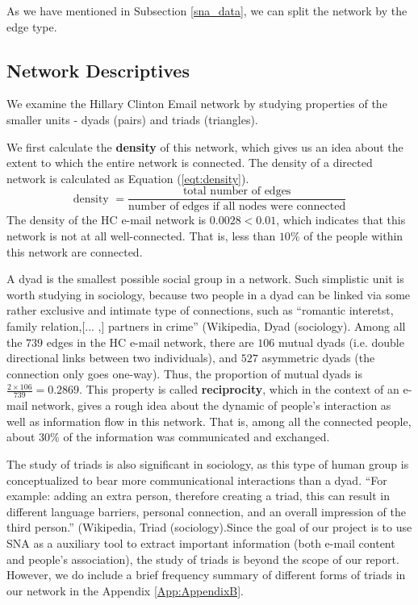 \documentclass[11pt]{article}
\begin{document}
\clearpage
As we have mentioned in Subsection \ref{sna_data}, we can split the network by the edge type.

\subsection{Network Descriptives}
We examine the Hillary Clinton Email network by studying properties of the smaller units - dyads (pairs) and triads (triangles).   

We first calculate the {\bf density} of this network, which gives us an idea about the extent to which the entire network is connected. The density of a directed network is calculated as Equation (\ref{eqt:density}).
\begin{equation}
\label{eqt:density}
\mbox{density }= \frac{\mbox{total number of edges}}{\mbox{number of edges if all nodes were connected}}
\end{equation}
The density of the HC e-mail network is $0.0028<0.01$, which indicates that this network is not at all well-connected. That is, less than $10\%$ of the people within this network are connected. 

A dyad is the smallest possible social group in a network. Such simplistic unit is worth studying in sociology, because two people in a dyad can be linked via some rather exclusive and intimate type of connections, such as ``romantic interetst, family relation,[... ,] partners in crime'' (Wikipedia, Dyad (sociology)\cite{wiki_dyad}.   Among all the $739$ edges in the HC e-mail network, there are $106$ mutual dyads (i.e. double directional links between two individuals), and $527$ asymmetric dyads (the connection only goes one-way). Thus, the proportion of mutual dyads is $\frac{2 \times 106}{739}=0.2869$. This property is called {\bf reciprocity}, which in the context of an e-mail network, gives a rough idea about the dynamic of people's interaction as well as information flow in this network. That is, among all the connected people, about $30\%$ of the information was communicated and exchanged. 

The study of triads is also significant in sociology, as this type of human group is conceptualized to bear more communicational interactions than a dyad. ``For example: adding an extra person, therefore creating a triad, this can result in different language barriers, personal connection, and an overall impression of the third person.'' (Wikipedia, Triad (sociology)\cite{wiki_triad}.Since the goal of our project is to use SNA as a auxiliary  tool to extract important information (both e-mail content and people's association), the study of triads is beyond the scope of our report. However, we do include a brief frequency summary of different forms of triads in our network in the Appendix \ref{App:AppendixB}.
\end{document}
